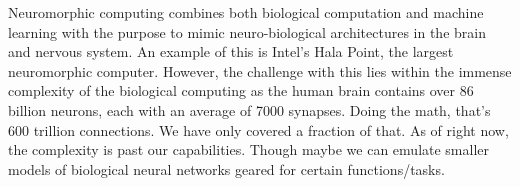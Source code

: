 \documentclass[letterpaper,11pt]{article}
\begin{document}
\begin{enumerate}[a)]
\begin{tcolorbox}
Neuromorphic computing combines both biological computation and machine learning with the purpose to mimic neuro-biological architectures in the brain and nervous system. An example of this is Intel's Hala Point, the largest neuromorphic computer. However, the challenge with this lies within the immense complexity of the biological computing as the human brain contains over 86 billion neurons, each with an average of 7000 synapses. Doing the math, that's 600 trillion connections. We have only covered a fraction of that. As of right now, the complexity is past our capabilities. Though maybe we can emulate smaller models of biological neural networks geared for certain functions/tasks.
\end{tcolorbox}
    
\end{enumerate}
\end{document}
